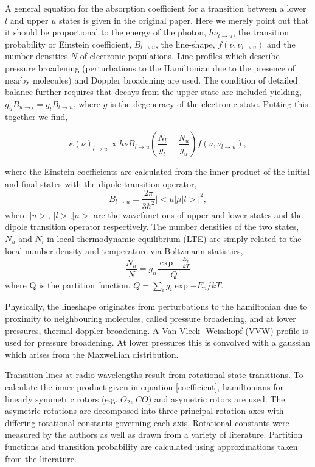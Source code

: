 A general equation for the absorption coefficient for a transition between a lower $l$ and upper $u$ states is given in the original paper. Here we merely point out that it should be proportional to the energy of the photon, $h\nu_{l \to u}$, the transition probability or Einstein coefficient, $ B_{l \to u}$, the line-shape, $f(\nu,\nu_{l \to u})$ and the number densities $N$ of electronic populations. Line profiles which describe pressure broadening (perturbations to the Hamiltonian due to the presence of nearby molecules) and Doppler broadening are used. The condition of detailed balance further requires that decays from the upper state are included yielding, $g_u B_{u \to l} =g_l B_{l \to u}$, where $g$ is the degeneracy of the electronic state. Putting this together we find,

\begin{equation}
\kappa(\nu) _{l \to u}  \propto  h\nu   B_{l \to u}  \left(\frac{N_l}{g_l}  -  \frac{N_u}{g_u} \right) f(\nu,\nu_{l \to u}),
\end{equation}

\noindent where the Einstein coefficients are calculated from the inner product of the initial and final states with the dipole transition operator, 
\begin{equation}\label{coefficient}
B_{l \to u} = \frac{2\pi}{3\hbar^2} |<u|\mu|l>|^2,
\end{equation}
where $|u>$, $|l>$,$|\mu>$ are the wavefunctions of upper and lower states and the dipole transition operator respectively.
The number densities of the two states, $N_u$ and $N_l$ in local thermodynamic equilibrium (LTE) are simply related to the local number density and temperature via Boltzmann statistics,
\begin{equation}
\frac{N_n}{N} = g_n \frac {\exp{-\frac{E_n}{kT}}}{Q}
\end{equation}
where Q is the partition function. $Q = \sum_i g_i  \exp{-E_n/kT}$. 

Physically, the lineshape originates from perturbations to the hamiltonian due to proximity to neighbouring molecules, called pressure broadening, and at lower pressures, thermal doppler broadening. A Van Vleck -Weisskopf (VVW) profile is used for pressure broadening. At lower pressures this is convolved with a gaussian which arises from the Maxwellian distribution. 


Transition lines at radio wavelengths result from rotational state transitions. To calculate the inner product given in equation \ref{coefficient}, hamiltonians for linearly symmetric rotors (e.g. $O_2$, $CO$) and asymetric rotors are used. The asymetric rotations are decomposed into three principal rotation axes with differing rotational constants governing each axis. Rotational constants were measured by the authors as well as drawn from a variety of literature. Partition functions and transition probability are calculated using approximations taken from the literature.


